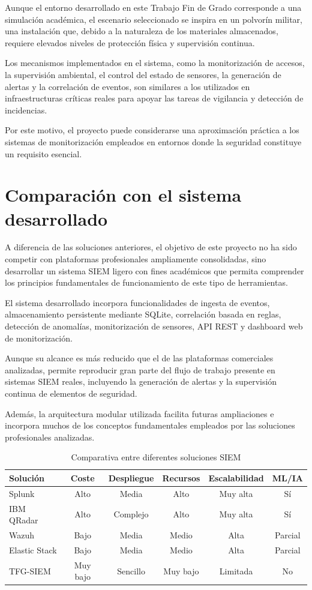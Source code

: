 Aunque el entorno desarrollado en este Trabajo Fin de Grado corresponde a una simulación académica, el escenario seleccionado se inspira en un polvorín militar, una instalación que, debido a la naturaleza de los materiales almacenados, requiere elevados niveles de protección física y supervisión continua.

Los mecanismos implementados en el sistema, como la monitorización de accesos, la supervisión ambiental, el control del estado de sensores, la generación de alertas y la correlación de eventos, son similares a los utilizados en infraestructuras críticas reales para apoyar las tareas de vigilancia y detección de incidencias.

Por este motivo, el proyecto puede considerarse una aproximación práctica a los sistemas de monitorización empleados en entornos donde la seguridad constituye un requisito esencial.

\section{Comparación con el sistema desarrollado}

A diferencia de las soluciones anteriores, el objetivo de este proyecto no ha sido competir con plataformas profesionales ampliamente consolidadas, sino desarrollar un sistema SIEM ligero con fines académicos que permita comprender los principios fundamentales de funcionamiento de este tipo de herramientas.

El sistema desarrollado incorpora funcionalidades de ingesta de eventos, almacenamiento persistente mediante SQLite, correlación basada en reglas, detección de anomalías, monitorización de sensores, API REST y dashboard web de monitorización.

Aunque su alcance es más reducido que el de las plataformas comerciales analizadas, permite reproducir gran parte del flujo de trabajo presente en sistemas SIEM reales, incluyendo la generación de alertas y la supervisión continua de elementos de seguridad.

Además, la arquitectura modular utilizada facilita futuras ampliaciones e incorpora muchos de los conceptos fundamentales empleados por las soluciones profesionales analizadas.

\begin{table}[htbp]
	\centering
	\begin{tabular}{|l|c|c|c|c|c|}
		\hline
		\textbf{Solución} & \textbf{Coste} & \textbf{Despliegue} & \textbf{Recursos} & \textbf{Escalabilidad} & \textbf{ML/IA} \\
		\hline
		Splunk & Alto & Media & Alto & Muy alta & Sí \\
		IBM QRadar & Alto & Complejo & Alto & Muy alta & Sí \\
		Wazuh & Bajo & Media & Medio & Alta & Parcial \\
		Elastic Stack & Bajo & Media & Medio & Alta & Parcial \\
		TFG-SIEM & Muy bajo & Sencillo & Muy bajo & Limitada & No \\
		\hline
	\end{tabular}
	\caption{Comparativa entre diferentes soluciones SIEM}
	\label{tab:comparativa_siem}
\end{table}

